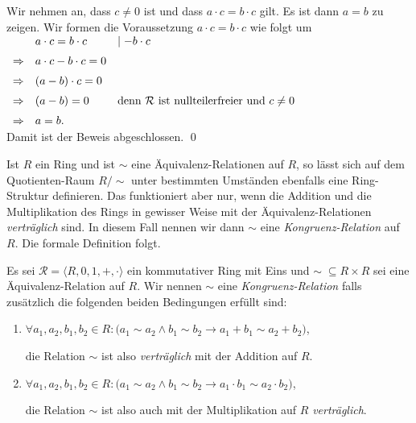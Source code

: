 \proof
Wir nehmen an, dass $c \not = 0$ ist und dass $a \cdot c = b \cdot c$ gilt.  Es ist dann $a = b$ zu zeigen. 
Wir formen die Voraussetzung  $a \cdot c = b \cdot c$ wie folgt um
\\[0.2cm]
\hspace*{1.3cm}
$
\begin{array}[t]{cll}
            & a \cdot c = b \cdot c      & \mid - b \cdot c \\[0.2cm]
\Rightarrow & a \cdot c - b \cdot c  = 0                    \\[0.2cm]
\Rightarrow & (a - b) \cdot c = 0                           \\[0.2cm]
\Rightarrow & (a - b) = 0 & \mbox{denn $\mathcal{R}$ ist nullteilerfreier und $c \not= 0$} \\[0.2cm]
\Rightarrow & a = b.
\end{array}
$
\\[0.2cm]
Damit ist der Beweis abgeschlossen. \qed
\vspace*{0.2cm}

Ist $R$ ein Ring und ist $\sim$ eine Äquivalenz-Relationen auf $R$,
so lässt sich auf dem Quotienten-Raum $R/\!\sim$ unter bestimmten Umständen ebenfalls eine Ring-Struktur
definieren.   Das funktioniert aber nur, wenn die Addition und die Multiplikation des Rings in gewisser
Weise mit der Äquivalenz-Relationen \emph{verträglich} sind.  In diesem Fall nennen wir dann $\sim$ eine
\emph{Kongruenz-Relation} auf $R$.  Die formale Definition folgt.

\begin{Definition}
Es sei $\mathcal{R} = \langle R, 0, 1, +, \cdot \rangle$ ein kommutativer Ring mit Eins und $\sim\; \subseteq R \times R$ sei eine
Äquivalenz-Relation auf $R$.   Wir nennen $\sim$ eine \emph{Kongruenz-Relation} falls zusätzlich
die folgenden beiden Bedingungen erfüllt sind:
\begin{enumerate}
\item $\forall a_1, a_2, b_1, b_2 \in R: 
       \bigl(a_1 \sim a_2 \wedge b_1 \sim b_2 \rightarrow a_1 + b_1 \sim a_2 + b_2\bigr)
      $,

      die Relation $\sim$ ist also \emph{verträglich} mit der Addition auf $R$.
\item $\forall a_1, a_2, b_1, b_2 \in R: 
       \bigl(a_1 \sim a_2 \wedge b_1 \sim b_2 \rightarrow a_1 \cdot b_1 \sim a_2 \cdot b_2\bigr)
      $,

      die Relation $\sim$ ist also auch mit der Multiplikation auf $R$ \emph{verträglich}.
      \eox
\end{enumerate}
\end{Definition}
  
